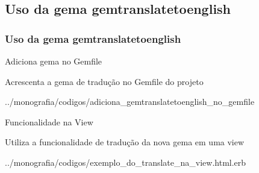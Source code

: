 \subsection{Uso da gema gemtranslatetoenglish}
\begin{frame}
 \frametitle{Uso da gema gemtranslatetoenglish}

  \begin{block}{Adiciona gema no Gemfile}

    Acrescenta a gema de tradução no Gemfile do projeto

    
    {../monografia/codigos/adiciona_gemtranslatetoenglish_no_gemfile}

  \end{block}

  \begin{block}{Funcionalidade na View}

    Utiliza a funcionalidade de tradução da nova gema em uma view

    
    {../monografia/codigos/exemplo_do_translate_na_view.html.erb}

  \end{block}

\end{frame}
